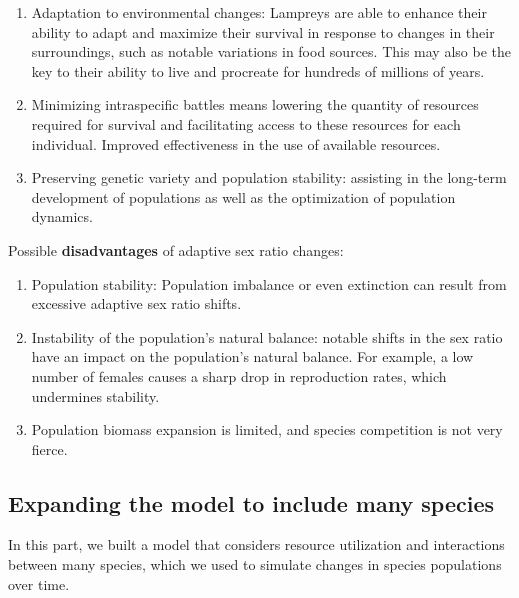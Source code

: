 \documentclass[12pt]{article}  %
\begin{document}
\begin{enumerate}[\bfseries (1).]
	\item Adaptation to environmental changes: Lampreys are able to enhance their ability to adapt and maximize their survival in response to changes in their surroundings, such as notable variations in food sources. This may also be the key to their ability to live and procreate for hundreds of millions of years.
	\item Minimizing intraspecific battles means lowering the quantity of resources required for survival and facilitating access to these resources for each individual. Improved effectiveness in the use of available resources.
	\item Preserving genetic variety and population stability: assisting in the long-term development of populations as well as the optimization of population dynamics.
\end{enumerate}


Possible \textbf{disadvantages} of adaptive sex ratio changes:
\begin{enumerate}[\bfseries (1).]
	\item Population stability: Population imbalance or even extinction can result from excessive adaptive sex ratio shifts.
	\item Instability of the population's natural balance: notable shifts in the sex ratio have an impact on the population's natural balance. For example, a low number of females causes a sharp drop in reproduction rates, which undermines stability.
	\item Population biomass expansion is limited, and species competition is not very fierce.
\end{enumerate}




\subsection{Expanding the model to include many species}
In this part, we built a model that considers resource utilization and interactions between many species, which we used to simulate changes in species populations over time.\par
\end{document}
